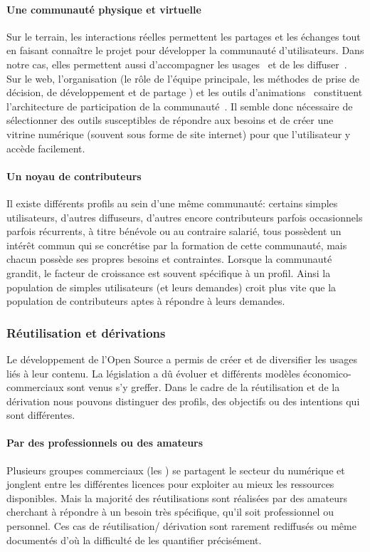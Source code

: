             \paragraph{Une communauté physique et virtuelle}
                Sur le terrain, les interactions réelles permettent les partages et les échanges tout en faisant connaître le projet pour développer la communauté d'utilisateurs. Dans notre cas, elles permettent aussi d'accompagner les usages~ et de les diffuser~.
                Sur le web, l’organisation (le rôle de l’équipe principale, les méthodes de prise de décision, de développement et de partage \etc) et les outils d’animations~ constituent l’architecture de participation de la communauté~. Il semble donc nécessaire de sélectionner des outils susceptibles de répondre aux besoins et de créer une vitrine numérique (souvent sous forme de site internet) pour que l'utilisateur y accède facilement. 
            \paragraph{Un noyau de contributeurs}
                Il existe différents profils au sein d'une même communauté: certains simples utilisateurs, d'autres diffuseurs, d'autres encore contributeurs parfois occasionnels parfois récurrents, à titre bénévole ou au contraire salarié, tous possèdent un intérêt commun qui se concrétise par la formation de cette communauté, mais chacun possède ses propres besoins et contraintes.
                Lorsque la communauté grandit, le facteur de croissance est souvent spécifique à un profil. Ainsi la population de simples utilisateurs (et leurs demandes) croit plus vite que la population de contributeurs aptes à répondre à leurs demandes. 
        \subsubsection{Réutilisation et dérivations}\label{sec:re-use}
            Le développement de l'Open Source a permis de créer et de diversifier les usages liés à leur contenu. La législation a dû évoluer et différents modèles économico-commerciaux sont venus s'y greffer. 
            Dans le cadre de la réutilisation et de la dérivation nous pouvons distinguer des profils, des objectifs ou des intentions qui sont différentes.
            \paragraph{Par des professionnels ou des amateurs} 
                Plusieurs groupes commerciaux (\ie les ) se partagent le secteur du numérique et jonglent entre les différentes licences pour exploiter au mieux les ressources disponibles. 
                Mais la majorité des réutilisations sont réalisées par des amateurs cherchant à répondre à un besoin très spécifique, qu'il soit professionnel ou personnel. Ces cas de réutilisation/ dérivation sont rarement rediffusés ou même documentés d'où la difficulté de les quantifier précisément.
